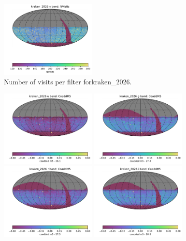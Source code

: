 \documentclass[DM,lsstdraft,authoryear,toc]{lsstdoc}
\begin{document}
\begin{figure}[ht]
\includegraphics[width=0.43\textwidth]{figures/kraken_2026_NVisits_y_band_HEAL_SkyMap}
\caption{Number of visits per filter forkraken\_2026.
\label{fig:baseline_nvisits}}
\end{figure}

\begin{figure}[ht]
\centering
\includegraphics[width=0.43\textwidth]{figures/kraken_2026_CoaddM5_u_band_HEAL_SkyMap}
\includegraphics[width=0.43\textwidth]{figures/kraken_2026_CoaddM5_g_band_HEAL_SkyMap} \\
\includegraphics[width=0.43\textwidth]{figures/kraken_2026_CoaddM5_r_band_HEAL_SkyMap}
\includegraphics[width=0.43\textwidth]{figures/kraken_2026_CoaddM5_i_band_HEAL_SkyMap}  \\

\end{figure}
\end{document}
